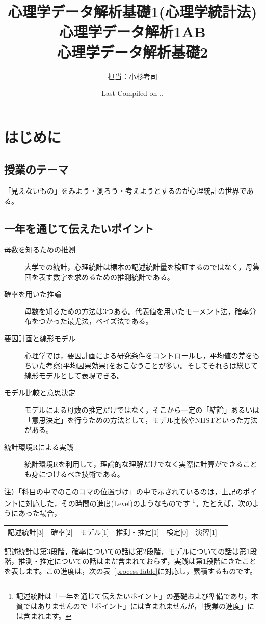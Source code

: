 \documentclass[dvipsnames]{ltjsarticle}
\begin{document}
\title{心理学データ解析基礎1(心理学統計法)\\心理学データ解析1AB\\心理学データ解析基礎2}
\author{担当：小杉考司}
\date{Last Compiled on \number\year .\number\month .\number\day}
\maketitle

\setcounter{tocdepth}{1}
\newpage
\section*{はじめに}
\subsection*{授業のテーマ}

「見えないもの」をみよう・測ろう・考えようとするのが心理統計の世界である。

\subsection*{一年を通じて伝えたいポイント}
\begin{description}
	\item[母数を知るための推測] 大学での統計，心理統計は標本の記述統計量を検証するのではなく，母集団を表す数字を求めるための推測統計である。
	\item[確率を用いた推論] 母数を知るための方法は3つある。代表値を用いたモーメント法，確率分布をつかった最尤法，ベイズ法である。
	\item[要因計画と線形モデル] 心理学では，要因計画による研究条件をコントロールし，平均値の差をもちいた考察(平均因果効果)をおこなうことが多い。そしてそれらは総じて線形モデルとして表現できる。
	\item[モデル比較と意思決定] モデルによる母数の推定だけではなく，そこから一定の「結論」あるいは「意思決定」を行うための方法として，モデル比較やNHSTといった方法がある。
	\item[統計環境Rによる実践] 統計環境Rを利用して，理論的な理解だけでなく実際に計算ができることも身につけるべき技術である。
\end{description}

注）「科目の中でのこのコマの位置づけ」の中で示されているのは，上記のポイントに対応した，その時間の進度(Level)のようなものです
\footnote{記述統計は「一年を通じて伝えたいポイント」の基礎および準備であり，本質ではありませんので「ポイント」には含まれませんが，「授業の進度」には含まれます。}。たとえば，次のようにあった場合，
\begin{tcolorbox}
	\begin{tabular}[t]{ccccccc}
		記述統計[3] & 確率[2] & モデル[1] & 推測・推定[1] & 検定[0] & 演習[1]
	\end{tabular}
\end{tcolorbox}
記述統計は第3段階，確率についての話は第2段階，モデルについての話は第1段階，推測・推定についての話はまだ含まれておらず，実践は第1段階にきたことを表します。この進度は，次の表~\ref{processTable}に対応し，累積するものです。
\end{document}
